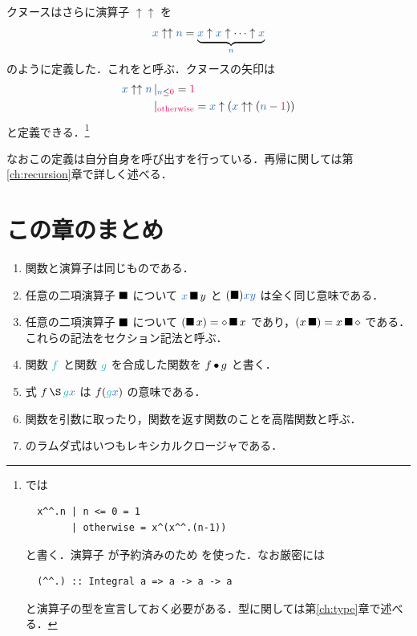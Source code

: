\documentclass[a5paper,twoside,fleqn,draft]{jsbook}
\begin{document}
クヌースはさらに演算子 $\uparrow\uparrow$ を
\begin{equation}
  \hVar{x}\uparrow\uparrow\hVar{n}
  =\underbrace{\hVar{x}\uparrow\hVar{x}\uparrow\dotsb\uparrow\hVar{x}}_{\hVar{n}}
\end{equation}
のように定義した．これをと呼ぶ．クヌースの矢印は
\begin{align}
  \hVar{x}\uparrow\uparrow\hVar{n}
  &\hGuard{\hVar{n}\le\hConstant{0}}=\hConstant{1}\\
  &\hGuard{\hOtherwise}
  =\hVar{x}\uparrow(\hVar{x}\uparrow\uparrow(\hVar{n}-\hConstant{1}))
\end{align}
と定義できる．\footnote{\haskell では
\begin{verbatim}
  x^^.n | n <= 0 = 1 
        | otherwise = x^(x^^.(n-1))
\end{verbatim}
と書く．演算子 \code{\textasciicircum\textasciicircum} が予約済みのため  を使った．なお厳密には
\begin{verbatim}
  (^^.) :: Integral a => a -> a -> a
\end{verbatim}
と演算子の型を宣言しておく必要がある．型に関しては第\ref{ch:type}章で述べる．}

なおこの定義は自分自身を呼び出すを行っている．再帰に関しては第\ref{ch:recursion}章で詳しく述べる．

\section{この章のまとめ}

\begin{enumerate}
\item 関数と演算子は同じものである．
\item 任意の二項演算子 $\operatorname{\blacksquare}$ について $\hVar{x}\hAnyBinOp y$ と $(\hAnyBinOp)\hVar{x}\hVar{y}$ は全く同じ意味である．
\item 任意の二項演算子 $\operatorname{\blacksquare}$ について $(\operatorname{\blacksquare} x)=\diamond\operatorname{\blacksquare} x$ であり，$(x\operatorname{\blacksquare})=x\operatorname{\blacksquare}\diamond$ である．これらの記法をセクション記法と呼ぶ．
\item 関数 $\hFunc{f}$ と関数 $\hFunc{g}$ を合成した関数を $f\operatorname{\bullet} g$ と書く．
\item 式 $f\hApply \hFunc{g}\hVar{x}$ は $f(\hFunc{g}\hVar{x})$ の意味である．
\item 関数を引数に取ったり，関数を返す関数のことを高階関数と呼ぶ．
\item \haskell のラムダ式はいつもレキシカルクロージャである．
\end{enumerate}
\end{document}
